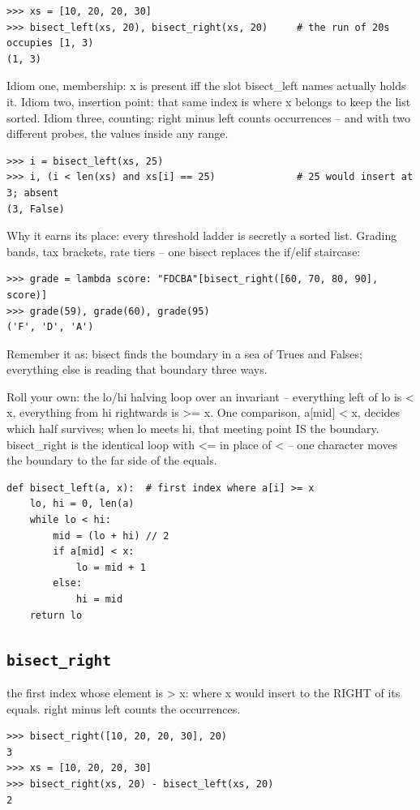 \documentclass[10pt,letterpaper]{book}
\begin{document}
\begin{lstlisting}[style=ex]
>>> xs = [10, 20, 20, 30]
>>> bisect_left(xs, 20), bisect_right(xs, 20)     # the run of 20s occupies [1, 3)
(1, 3)
\end{lstlisting}

Idiom one, membership: x is present iff the slot bisect\_left names actually holds it. Idiom two, insertion point: that same index is where x belongs to keep the list sorted. Idiom three, counting: right minus left counts occurrences -- and with two different probes, the values inside any range.

\begin{lstlisting}[style=ex]
>>> i = bisect_left(xs, 25)
>>> i, (i < len(xs) and xs[i] == 25)              # 25 would insert at 3; absent
(3, False)
\end{lstlisting}

Why it earns its place: every threshold ladder is secretly a sorted list. Grading bands, tax brackets, rate tiers -- one bisect replaces the if/elif staircase:

\begin{lstlisting}[style=ex]
>>> grade = lambda score: "FDCBA"[bisect_right([60, 70, 80, 90], score)]
>>> grade(59), grade(60), grade(95)
('F', 'D', 'A')
\end{lstlisting}

Remember it as: bisect finds the boundary in a sea of Trues and Falses; everything else is reading that boundary three ways.


Roll your own: the lo/hi halving loop over an invariant -- everything left of lo is < x, everything from hi rightwards is >= x. One comparison, a[mid] < x, decides which half survives; when lo meets hi, that meeting point IS the boundary. bisect\_right is the identical loop with <= in place of < -- one character moves the boundary to the far side of the equals.

\begin{lstlisting}[style=ex]
def bisect_left(a, x):  # first index where a[i] >= x
    lo, hi = 0, len(a)
    while lo < hi:
        mid = (lo + hi) // 2
        if a[mid] < x:
            lo = mid + 1
        else:
            hi = mid
    return lo
\end{lstlisting}

\subsection{\texttt{bisect\_right}}\label{def:bisect-right}
the first index whose element is > x: where x would insert to the RIGHT of its equals. right minus left counts the occurrences.
\begin{lstlisting}[style=ex]
>>> bisect_right([10, 20, 20, 30], 20)
3
>>> xs = [10, 20, 20, 30]
>>> bisect_right(xs, 20) - bisect_left(xs, 20)
2
\end{lstlisting}
\end{document}

